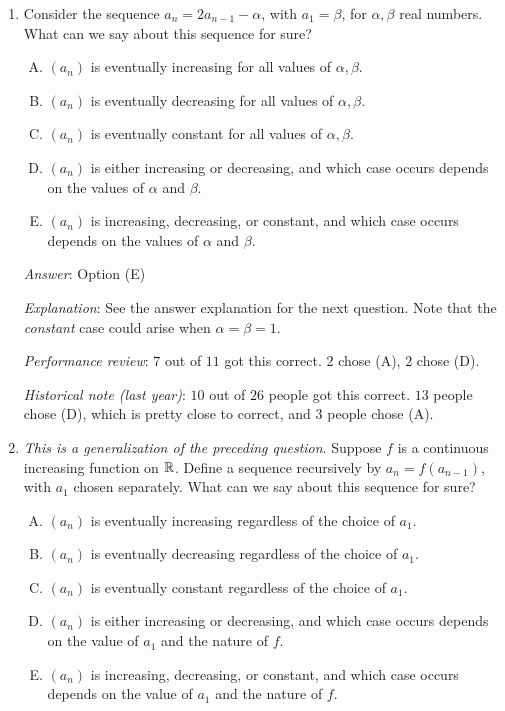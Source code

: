 \documentclass[10pt]{amsart}
\begin{document}
\begin{enumerate}
\item Consider the sequence $a_n = 2a_{n-1} - \alpha$, with $a_1 =
  \beta$, for $\alpha, \beta$ real numbers. What can we say about this
  sequence for sure?

  \begin{enumerate}[(A)]
  \item $(a_n)$ is eventually increasing for all values of $\alpha,
    \beta$.
  \item $(a_n)$ is eventually decreasing for all values of $\alpha,
    \beta$.
  \item $(a_n)$ is eventually constant for all values of $\alpha,
    \beta$.
  \item $(a_n)$ is either increasing or decreasing, and which case
    occurs depends on the values of $\alpha$ and $\beta$.
  \item $(a_n)$ is increasing, decreasing, or constant, and which case
    occurs depends on the values of $\alpha$ and $\beta$.
  \end{enumerate}

  {\em Answer}: Option (E)

  {\em Explanation}: See the answer explanation for the next
  question. Note that the {\em constant} case could arise when $\alpha
  = \beta = 1$.

  {\em Performance review}: $7$ out of $11$ got this correct. $2$
  chose (A), $2$ chose (D).

  {\em Historical note (last year)}: $10$ out of $26$ people got this
  correct. $13$ people chose (D), which is pretty close to correct,
  and $3$ people chose (A).
\item {\em This is a generalization of the preceding question}. Suppose
  $f$ is a continuous increasing function on $\mathbb{R}$. Define a sequence
  recursively by $a_n = f(a_{n-1})$, with $a_1$ chosen
  separately. What can we say about this sequence for sure?
  \begin{enumerate}[(A)]
  \item $(a_n)$ is eventually increasing regardless of the choice of $a_1$.
  \item $(a_n)$ is eventually decreasing regardless of the choice of $a_1$.
  \item $(a_n)$ is eventually constant regardless of the choice of $a_1$.
  \item $(a_n)$ is either increasing or decreasing, and which case
    occurs depends on the value of $a_1$ and the nature of $f$.
  \item $(a_n)$ is increasing, decreasing, or constant, and which case
    occurs depends on the value of $a_1$ and the nature of $f$.
  \end{enumerate}


\end{enumerate}
\end{document}
